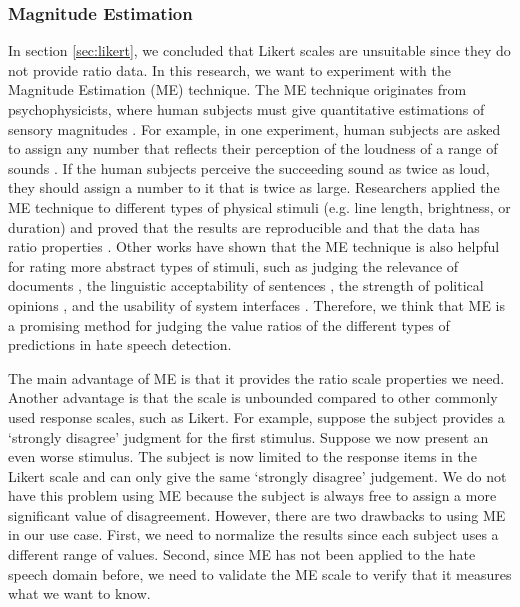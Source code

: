 \subsubsection{Magnitude Estimation}
\label{sec:me}
In section \ref{sec:likert}, we concluded that Likert scales are unsuitable since they do not provide ratio data.
%
In this research, we want to experiment with the Magnitude Estimation (ME) technique.
%
The ME technique originates from psychophysicists, where human subjects must give quantitative estimations of sensory magnitudes \citep{stevens1956direct}.
%
For example, in one experiment, human subjects are asked to assign any number that reflects their perception of the loudness of a range of sounds \citep{stevens1956direct}.
%
If the human subjects perceive the succeeding sound as twice as loud, they should assign a number to it that is twice as large.
%
Researchers applied the ME technique to different types of physical stimuli (e.g. line length, brightness, or duration) and proved that the results are reproducible and that the data has ratio properties \citep{moskowitz1977magnitude}.
%
Other works have shown that the ME technique is also helpful for rating more abstract types of stimuli, such as judging the relevance of documents \citep{maddalena2017crowdsourcing, roitero2018fine}, the linguistic acceptability of sentences \citep{bard1996magnitude}, the strength of political opinions \citep{lodge1979comparisons, lodge1976calibration}, and the usability of system interfaces \citep{mcgee2004master}.
%
Therefore, we think that ME is a promising method for judging the value ratios of the different types of predictions in hate speech detection.
%

%
The main advantage of ME is that it provides the ratio scale properties we need.
%
Another advantage is that the scale is unbounded compared to other commonly used response scales, such as Likert.
%
For example, suppose the subject provides a `strongly disagree' judgment for the first stimulus.
%
Suppose we now present an even worse stimulus.
%
The subject is now limited to the response items in the Likert scale and can only give the same `strongly disagree' judgement.
%
We do not have this problem using ME because the subject is always free to assign a more significant value of disagreement.
%
However, there are two drawbacks to using ME in our use case.
%
First, we need to normalize the results since each subject uses a different range of values.
%
Second, since ME has not been applied to the hate speech domain before, we need to validate the ME scale to verify that it measures what we want to know.
%

